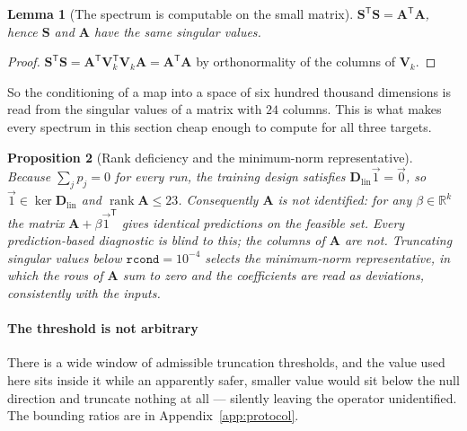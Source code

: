 \documentclass[11pt,a4paper]{article}
\newcommand{\vect}[1]{\mathbf{#1}}
\newcommand{\Real}{\mathbb{R}}
\DeclareMathOperator{\rank}{rank}
\theoremstyle{plain}
\newtheorem{proposition}{Proposition}
\newtheorem{lemma}[proposition]{Lemma}
\theoremstyle{definition}
\theoremstyle{remark}
\begin{document}
\begin{lemma}[The spectrum is computable on the small matrix]
\label{lem:spectrum}
$\vect{S}^{\mathsf{T}}\vect{S} = \vect{A}^{\mathsf{T}}\vect{A}$, hence
$\vect{S}$ and $\vect{A}$ have the same singular values.
\end{lemma}

\begin{proof}
$\vect{S}^{\mathsf{T}}\vect{S}
= \vect{A}^{\mathsf{T}}\vect{V}_k^{\mathsf{T}}\vect{V}_k\vect{A}
= \vect{A}^{\mathsf{T}}\vect{A}$ by orthonormality of the columns of
$\vect{V}_k$.
\end{proof}

So the conditioning of a map into a space of six hundred thousand dimensions is
read from the singular values of a matrix with $24$ columns. This is what makes
every spectrum in this section cheap enough to compute for all three targets.

\begin{proposition}[Rank deficiency and the minimum-norm representative]
\label{prop:rank}
Because $\sum_j p_j = 0$ for every run, the training design satisfies
$\vect{D}_{\mathrm{lin}}\vec{1} = \vec{0}$, so $\vec{1} \in \ker
\vect{D}_{\mathrm{lin}}$ and $\rank\vect{A} \le 23$. Consequently $\vect{A}$ is
\emph{not identified}: for any $\beta\in\Real^{k}$ the matrix
$\vect{A} + \beta\vec{1}^{\mathsf{T}}$ gives identical predictions on the
feasible set. Every prediction-based diagnostic is blind to this; the columns of
$\vect{A}$ are not. Truncating singular values below $\texttt{rcond}=10^{-4}$
selects the minimum-norm representative, in which the rows of $\vect{A}$ sum to
zero and the coefficients are read as deviations, consistently with the inputs.
\end{proposition}

\paragraph{The threshold is not arbitrary}
There is a wide window of admissible truncation thresholds, and the value used
here sits inside it while an apparently safer, smaller value would sit below the
null direction and truncate nothing at all --- silently leaving the operator
unidentified. The bounding ratios are in Appendix~\ref{app:protocol}.
\end{document}
